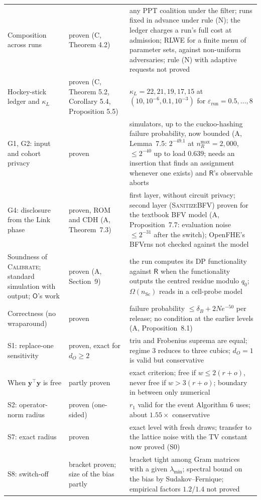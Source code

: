 \documentclass[11pt]{article}
\begin{document}
{\begin{xltabular}{\textwidth}{@{}>{\raggedright\arraybackslash}p{3.9cm}>{\raggedright\arraybackslash}p{2.5cm}>{\raggedright\arraybackslash}X@{}}
Composition across runs & proven (C, Theorem 4.2) & any PPT coalition under the filter; runs fixed in advance under rule (N); the ledger charges a run's full cost at admission; RLWE for a finite menu of parameter sets, against non-uniform adversaries; rule (N) with adaptive requests not proved \\
Hockey-stick ledger and $\kappa_L$ & proven (C, Theorem 5.2, Corollary 5.4, Proposition 5.5) & $\kappa_L=22,21,19,17,15$ at $(10,10^{-6},0.1,10^{-3})$ for $\varepsilon_{\mathrm{run}}=0.5,\dots,8$ \\
G1, G2: input and cohort privacy & proven & simulators, up to the cuckoo-hashing failure probability, now bounded (A, Lemma~7.5: $2^{-49.1}$ at $n_R^{\max}=2{,}000$, $\le2^{-40}$ up to load $0.639$; needs an insertion that finds an assignment whenever one exists) and $\mathsf{R}$'s observable aborts \\
G4: disclosure from the Link phase & proven, ROM and CDH (A, Theorem~7.3) & first layer, without circuit privacy; second layer (\textsc{SanitizeBFV}) proven for the textbook BFV model (A, Proposition~7.7: evaluation noise $\le2^{-31}$ after the switch); OpenFHE's BFVrns not checked against the model \\
Soundness of \textsc{Calibrate}; standard simulation with output; $\mathsf{O}$'s work & proven (A, Section~9) & the run computes its DP functionality against $\mathsf{R}$ when the functionality outputs the centred residue modulo $q_0$; $\Omega(n_{\mathrm{Sc}})$ reads in a cell-probe model \\
Correctness (no wraparound) & proven & failure probability $\le\delta_B+2N e^{-50}$ per release; no condition at the earlier levels (A, Proposition~8.1) \\
S1: replace-one sensitivity & proven, exact for $d_O\ge2$ & triu and Frobenius suprema are equal; regime 3 reduces to three cubics; $d_O=1$ is valid but conservative \\
When $\mathbf y^\top\mathbf y$ is free & partly proven & exact criterion; free if $w\le2(r+o)$, never free if $w>3(r+o)$; boundary in between only numerical \\
S2: operator-norm radius & proven (one-sided) & $r_1$ valid for the event Algorithm 6 uses; about $1.55\times$ conservative \\
S7: exact radius & proven & exact level with fresh draws; transfer to the lattice noise with the TV constant now proved (S0) \\
S8: switch-off & bracket proven; size of the bias partly & bracket tight among Gram matrices with a given $\lambda_{\min}$; spectral bound on the bias by Sudakov--Fernique; empirical factors $1.2$/$1.4$ not proved \\

\end{xltabular}}
\end{document}
